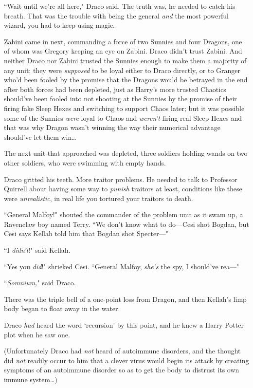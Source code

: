 ``Wait until we're all here," Draco said. The truth was, he needed to catch his breath. That was the trouble with being the general \emph{and} the most powerful wizard, you had to keep using magic.

Zabini came in next, commanding a force of two Sunnies and four Dragons, one of whom was Gregory keeping an eye on Zabini. Draco didn't trust Zabini. And neither Draco nor Zabini trusted the Sunnies enough to make them a majority of any unit; they were \emph{supposed} to be loyal either to Draco directly, or to Granger who'd been fooled by the promise that the Dragons would be betrayed in the end after both forces had been depleted, just as Harry's more trusted Chaotics should've been fooled into not shooting at the Sunnies by the promise of their firing fake Sleep Hexes and switching to support Chaos later; but it was possible some of the Sunnies \emph{were} loyal to Chaos and \emph{weren't} firing real Sleep Hexes and that was why Dragon wasn't winning the way their numerical advantage should've let them win{\ldots}

The next unit that approached was depleted, three soldiers holding wands on two other soldiers, who were swimming with empty hands.

Draco gritted his teeth. More traitor problems. He needed to talk to Professor Quirrell about having some way to \emph{punish} traitors at least, conditions like these were \emph{unrealistic}, in real life you tortured your traitors to death.

``General Malfoy!" shouted the commander of the problem unit as it swam up, a Ravenclaw boy named Terry. ``We don't know what to do—Cesi shot Bogdan, but Cesi says Kellah told him that Bogdan shot Specter—"

``I \emph{didn't}!" said Kellah.

``Yes you \emph{did}!" shrieked Cesi. ``General Malfoy, \emph{she's} the spy, I should've rea—"

``\emph{Somnium,}" said Draco.

There was the triple bell of a one-point loss from Dragon, and then Kellah's limp body began to float away in the water.

Draco \emph{had} heard the word `recursion' by this point, and he knew a Harry Potter plot when he saw one.

(Unfortunately Draco had \emph{not} heard of autoimmune disorders, and the thought did \emph{not} readily occur to him that a clever virus would begin its attack by creating symptoms of an autoimmune disorder so as to get the body to distrust its own immune system{\ldots})


